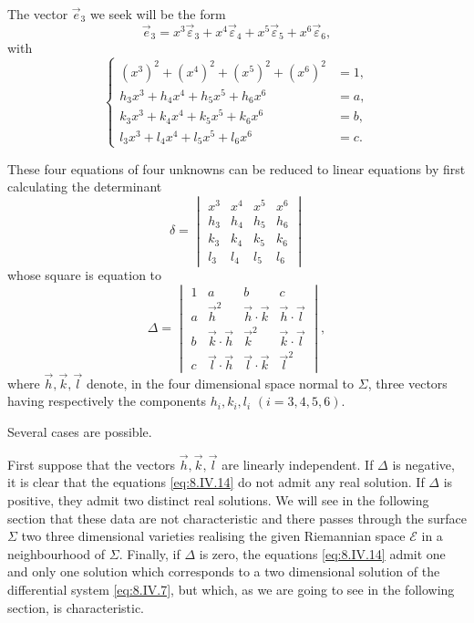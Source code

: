 \documentclass[leqno,11pt]{book}
\numberwithin{equation}{chapter}
\theoremstyle{shape1}
\theoremstyle{shape0}
\theoremstyle{shape2}
\theoremstyle{definition}
\begin{document}
The vector $\vec e_{3}$ we seek will be the form
\[
\vec e_{3}=x^{3}\vec\varepsilon_{3}+x^{4}\vec\varepsilon_{4}+x^{5}\vec\varepsilon_{5}+x^{6}\vec\varepsilon_{6},
\]
with
\begin{equation}
  \label{eq:8.IV.14}\tag{IV, 14}
  \left\{
    \begin{aligned}
      (x^{3})^{2}+(x^{4})^{2}+(x^{5})^{2}+(x^{6})^{2}&=1,\\
      h_{3}x^{3}+h_{4}x^{4}+h_{5}x^{5}+h_{6}x^{6}&=a,\\
      k_{3}x^{3}+k_{4}x^{4}+k_{5}x^{5}+k_{6}x^{6}&=b,\\
      l_{3}x^{3}+l_{4}x^{4}+l_{5}x^{5}+l_{6}x^{6}&=c.
    \end{aligned}
  \right.
\end{equation}

These four equations of four unknowns can be reduced to linear equations by first calculating the determinant
\begin{equation}
  \label{eq:8.IV.15}\tag{IV, 15}
  \delta=
  \begin{vmatrix}
    x^{3}&x^{4}&x^{5}&x^{6}\\
    h_{3}&h_{4}&h_{5}&h_{6}\\
    k_{3}&k_{4}&k_{5}&k_{6}\\
    l_{3}&l_{4}&l_{5}&l_{6}
  \end{vmatrix}
\end{equation}
whose square is equation to
\[
\Delta=
\begin{vmatrix}
  1&a&b&c\\
  a&\vec h^{2}&\vec h\cdot\vec k&\vec h\cdot\vec l\\
  b&\vec k\cdot\vec h&\vec k^{2}&\vec k\cdot\vec l\\
  c&\vec l\cdot\vec h&\vec l\cdot\vec k&\vec l^{2}
\end{vmatrix},
\]
where $\vec h,\vec k,\vec l$ denote, in the four dimensional space normal to $\Sigma$, three vectors having respectively the components $h_{i},k_{i},l_{i}$ $(i=3,4,5,6)$.

Several cases are possible.

First suppose that the vectors $\vec h,\vec k, \vec l$ are linearly independent. If $\Delta$ is negative, it is clear that the equations \eqref{eq:8.IV.14} do not admit any real solution. If $\Delta$ is positive, they admit two distinct real solutions. We will see in the following section that these data are not characteristic and there passes through the surface $\Sigma$ two three dimensional varieties realising the given Riemannian space $\mathcal{E}$ in a neighbourhood of $\Sigma$. Finally, if $\Delta$ is zero, the equations \eqref{eq:8.IV.14} admit one and only one solution which corresponds to a two dimensional solution of the differential system \eqref{eq:8.IV.7}, but which, as we are going to see in the following section, is characteristic.
\end{document}
